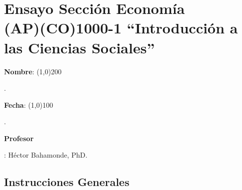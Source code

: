 \documentclass{article}
\begin{document}
%

{\centering\section*{Ensayo Secci\'on Econom\'ia\\(AP)(CO)1000-1 ``Introducci\'on a las Ciencias Sociales''}}

{\vspace{.5cm}\raggedright{\bf Nombre}: \line(1,0){200}}. %
{\vspace{.5cm}\hspace{4.5cm}\raggedright{\bf Fecha}: \line(1,0){100}}. %


{\vspace{.5cm}\raggedright \bf Profesor}: H\'ector Bahamonde, PhD.\\


\vspace{0.5cm}\subsection*{Instrucciones Generales}
\end{document}
